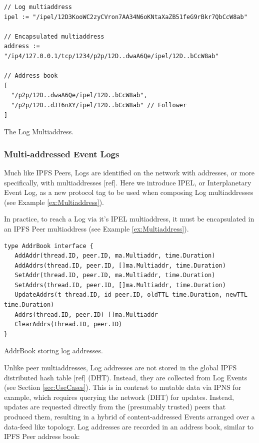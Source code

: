\documentclass{comjnl}
\begin{document}
\begin{example*}
\centering
\begin{minipage}{0.7\textwidth}
\begin{lstlisting}
// Log multiaddress
ipel := "/ipel/12D3KooWC2zyCVron7AA34N6oKNtaXaZB51feG9rBkr7QbCcW8ab"

// Encapsulated multiaddress
address := "/ip4/127.0.0.1/tcp/1234/p2p/12D..dwaA6Qe/ipel/12D..bCcW8ab"

// Address book
[
  "/p2p/12D..dwaA6Qe/ipel/12D..bCcW8ab",
  "/p2p/12D..dJT6nXY/ipel/12D..bCcW8ab" // Follower
]
\end{lstlisting}
\end{minipage}
  \caption{The Log Multiaddress.}
  \label{ex:Multiaddress}
\end{example*}

\subsubsection{Multi-addressed Event Logs}

Much like IPFS Peers, Logs are identified on the network with addresses, or more specifically, with multiaddresses [ref]. Here we introduce IPEL, or Interplanetary Event Log, as a new protocol tag to be used when composing Log multiaddresses (see Example \ref{ex:Multiaddress}).

In practice, to reach a Log via it’s IPEL multiaddress, it must be encapsulated in an IPFS Peer multiaddress (see Example \ref{ex:Multiaddress}).

\begin{example}
\begin{lstlisting}
type AddrBook interface {
   AddAddr(thread.ID, peer.ID, ma.Multiaddr, time.Duration)
   AddAddrs(thread.ID, peer.ID, []ma.Multiaddr, time.Duration)
   SetAddr(thread.ID, peer.ID, ma.Multiaddr, time.Duration)
   SetAddrs(thread.ID, peer.ID, []ma.Multiaddr, time.Duration)
   UpdateAddrs(t thread.ID, id peer.ID, oldTTL time.Duration, newTTL time.Duration)
   Addrs(thread.ID, peer.ID) []ma.Multiaddr
   ClearAddrs(thread.ID, peer.ID)
}
\end{lstlisting}
\caption{AddrBook storing log addresses.}
\end{example} \label{ex:AddrBook}

Unlike peer multiaddresses, Log addresses are not stored in the global IPFS distributed hash table [ref] (DHT). Instead, they are collected from Log Events (see Section  \ref{sec:UseCases}). This is in contrast to mutable data via IPNS for example, which requires querying the network (DHT) for updates. Instead, updates are requested directly from the (presumably trusted) peers that produced them, resulting in a hybrid of content-addressed Events arranged over a data-feed like topology. Log addresses are recorded in an address book, similar to IPFS Peer address book:
\end{document}
